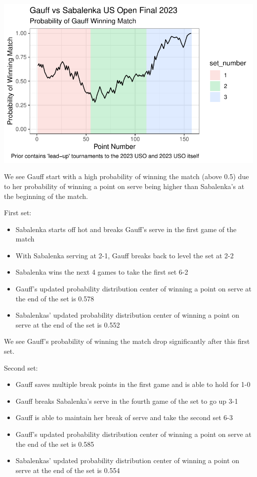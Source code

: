 \documentclass[
  letterpaper,
  DIV=11,
  numbers=noendperiod]{scrartcl}
\providecommand{\tightlist}{%
  \setlength{\itemsep}{0pt}\setlength{\parskip}{0pt}}\usepackage{longtable,booktabs,array}
\begin{document}
\includegraphics{Project_Write_Up_files/figure-pdf/unnamed-chunk-33-1.pdf}

\linespread{2}

We see Gauff start with a high probability of winning the match (above
0.5) due to her probability of winning a point on serve being higher
than Sabalenka's at the beginning of the match.

First set:

\begin{itemize}
\tightlist
\item
  Sabalenka starts off hot and breaks Gauff's serve in the first game of
  the match
\item
  With Sabalenka serving at 2-1, Gauff breaks back to level the set at
  2-2
\item
  Sabalenka wins the next 4 games to take the first set 6-2
\item
  Gauff's updated probability distribution center of winning a point on
  serve at the end of the set is 0.578
\item
  Sabalenkas' updated probability distribution center of winning a point
  on serve at the end of the set is 0.552
\end{itemize}

We see Gauff's probability of winning the match drop significantly after
this first set.

Second set:

\begin{itemize}
\tightlist
\item
  Gauff saves multiple break points in the first game and is able to
  hold for 1-0
\item
  Gauff breaks Sabalenka's serve in the fourth game of the set to go up
  3-1
\item
  Gauff is able to maintain her break of serve and take the second set
  6-3
\item
  Gauff's updated probability distribution center of winning a point on
  serve at the end of the set is 0.585
\item
  Sabalenkas' updated probability distribution center of winning a point
  on serve at the end of the set is 0.554
\end{itemize}
\end{document}
